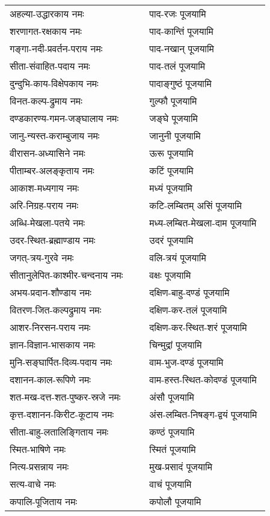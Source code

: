 \begin{center}
\begin{supertabular}{p{0.525\linewidth}p{0.45\linewidth}}
अहल्या-उद्धारकाय नमः & पाद-रजः पूजयामि \\
शरणागत-रक्षकाय नमः & पाद-कान्तिं पूजयामि \\
गङ्गा-नदी-प्रवर्तन-पराय नमः & पाद-नखान् पूजयामि \\
सीता-संवाहित-पदाय नमः & पाद-तलं पूजयामि \\
दुन्दुभि-काय-विक्षेपकाय नमः & पादाङ्गुष्ठं पूजयामि \\
विनत-कल्प-द्रुमाय नमः & गुल्फौ पूजयामि \\
दण्डकारण्य-गमन-जङ्घालाय नमः & जङ्घे पूजयामि \\
जानु-न्यस्त-कराम्बुजाय नमः & जानुनी पूजयामि \\
वीरासन-अध्यासिने नमः & ऊरू पूजयामि \\
पीताम्बर-अलङ्कृताय नमः & कटिं पूजयामि \\
आकाश-मध्यगाय नमः & मध्यं पूजयामि \\
अरि-निग्रह-पराय नमः & कटि-लम्बितम् असिं पूजयामि \\
अब्धि-मेखला-पतये नमः & मध्य-लम्बित-मेखला-दाम पूजयामि \\
उदर-स्थित-ब्रह्माण्डाय नमः & उदरं पूजयामि \\
जगत्-त्रय-गुरवे नमः & वलि-त्रयं पूजयामि \\
सीतानुलेपित-काश्मीर-चन्दनाय नमः & वक्षः पूजयामि \\
अभय-प्रदान-शौण्डाय नमः & दक्षिण-बाहु-दण्डं पूजयामि \\
वितरण-जित-कल्पद्रुमाय नमः & दक्षिण-कर-तलं पूजयामि \\
आशर-निरसन-पराय नमः & दक्षिण-कर-स्थित-शरं पूजयामि \\
ज्ञान-विज्ञान-भासकाय नमः & चिन्मुद्रां पूजयामि \\
मुनि-सङ्घार्पित-दिव्य-पदाय नमः & वाम-भुज-दण्डं पूजयामि \\
दशानन-काल-रूपिणे नमः & वाम-हस्त-स्थित-कोदण्डं पूजयामि \\
शत-मख-दत्त-शत-पुष्कर-स्रजे नमः & अंसौ पूजयामि \\
कृत्त-दशानन-किरीट-कूटाय नमः & अंस-लम्बित-निषङ्ग-द्वयं पूजयामि \\
सीता-बाहु-लतालिङ्गिताय नमः & कण्ठं पूजयामि \\
स्मित-भाषिणे नमः & स्मितं पूजयामि \\
नित्य-प्रसन्नाय नमः & मुख-प्रसादं पूजयामि \\
सत्य-वाचे नमः & वाचं पूजयामि \\
कपालि-पूजिताय नमः & कपोलौ पूजयामि \\

\end{supertabular}
\end{center}
